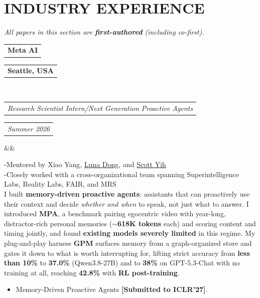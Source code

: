 \documentclass[11pt,a4paper,roman]{moderncv}        %
\makeatletter
\newcommand*{\customcventry}[7][.25em]{
  \begin{tabular}{@{}l} 
    {\bfseries #4}
  \end{tabular}
  \hfill%
  \begin{tabular}{l@{}}
     {\bfseries #5}
  \end{tabular} \\
  \begin{tabular}{@{}l} 
    {\itshape #3}
  \end{tabular}
  \hfill%
  \begin{tabular}{l@{}}
     {\itshape #2}
  \end{tabular}
  \ifx&#7&%
  \else{\\%
    \begin{minipage}{\maincolumnwidth}%
      \small#7%
    \end{minipage}}\fi%
  \par\addvspace{#1}}
\makeatother
\begin{document}
\section{INDUSTRY EXPERIENCE}
\textit{All papers in this section are \textbf{first-authored} (including co-first).}

{\customcventry{Summer 2026}{Research Scientist Intern/Next Generation Proactive Agents}{Meta AI}{Seattle, USA}{}{}
-Mentored by Xiao Yang, \href{https://lunadong.com/}{Luna Dong}, and \href{https://scottyih.org/}{Scott Yih}\\
-Closely worked with a cross-organizational team spanning Superintelligence Labs, Reality Labs, FAIR, and MRS\\
I built \textbf{memory-driven proactive agents}: assistants that can proactively use their context and decide \emph{whether and when} to speak, not just what to answer. I introduced \textbf{MPA}, a benchmark pairing egocentric video with year-long, distractor-rich personal memories (\textbf{$\sim$618K tokens} each) and scoring content and timing jointly, and found \textbf{existing models severely limited} in this regime. My plug-and-play harness \textbf{GPM} surfaces memory from a graph-organized store and gates it down to what is worth interrupting for, lifting strict accuracy from \textbf{less than 10\%} to \textbf{37.0\%} (Qwen3.8-27B) and to \textbf{38\%} on GPT-5.3-Chat with no training at all, reaching \textbf{42.8\%} with \textbf{RL post-training}.
\begin{itemize}
    \item Memory-Driven Proactive Agents \textbf{[Submitted to ICLR'27]}.
\end{itemize}
}
\end{document}
